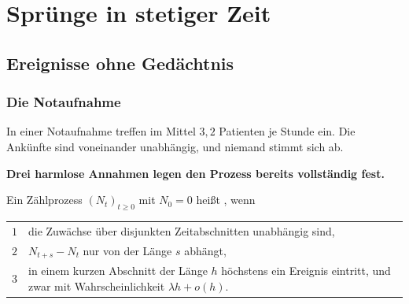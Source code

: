 \part{Sprünge in stetiger Zeit}

\chapter{Ereignisse ohne Gedächtnis}

\section{Die Notaufnahme}

\begin{merksatz}
In einer Notaufnahme treffen im Mittel $3{,}2$ Patienten je Stunde ein. Die Ankünfte sind voneinander unabhängig, und niemand stimmt sich ab.

\begin{center}
\begin{minipage}{0.9\textwidth}
\textbf{Drei harmlose Annahmen legen den Prozess bereits vollständig fest.}
\end{minipage}
\end{center}
\end{merksatz}

\begin{definition}
Ein Zählprozess $(N_t)_{t\ge0}$ mit $N_0 = 0$ heißt , wenn
\begin{center}
{\small
\renewcommand{\arraystretch}{1.5}
\begin{tabular}{@{}P{1.0cm}P{7.4cm}@{}}
\toprule
$1$ & die Zuwächse über disjunkten Zeitabschnitten unabhängig sind,\\
$2$ & $N_{t+s} - N_t$ nur von der Länge $s$ abhängt,\\
$3$ & in einem kurzen Abschnitt der Länge $h$ höchstens ein Ereignis eintritt, und zwar mit Wahrscheinlichkeit $\lambda h + o(h)$.\\
\bottomrule
\end{tabular}}
\end{center}
\end{definition}

